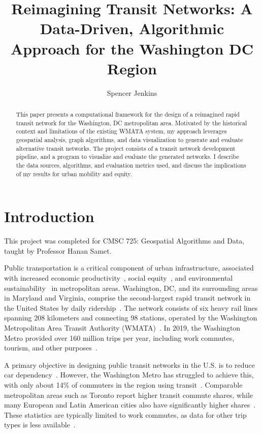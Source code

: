 \documentclass[manuscript,nonacm]{acmart}
\begin{document}
\title{Reimagining Transit Networks: A Data-Driven, Algorithmic Approach for the Washington DC Region}

\author{Spencer Jenkins}

\renewcommand{\shortauthors}{Trovato et al.}

\begin{abstract}
This paper presents a computational framework for the design of a reimagined rapid transit network for the Washington, DC metropolitan area. Motivated by the historical context and limitations of the existing WMATA system, my approach leverages geospatial analysis, graph algorithms, and data visualization to generate and evaluate alternative transit networks. The project consists of a transit network development pipeline, and a program to visualize and evaluate the generated networks. I describe the data sources, algorithms, and evaluation metrics used, and discuss the implications of my results for urban mobility and equity.
\end{abstract}

\maketitle



\section{Introduction}

This project was completed for CMSC 725: Geospatial Algorithms and Data, taught by Professor Hanan Samet. 

Public transportation is a critical component of urban infrastructure, associated with increased economic productivity~\cite{lit:us_transit_policy}, social equity~\cite{lit:equity}, and environmental sustainability~\cite{lit:us_transit_policy} in metropolitan areas. Washington, DC, and its surrounding areas in Maryland and Virginia, comprise the second-largest rapid transit network in the United States by daily ridership~\cite{lit:wmata_stats}. The network consists of six heavy rail lines spanning 208 kilometers and connecting 98 stations, operated by the Washington Metropolitan Area Transit Authority (WMATA)~\cite{lit:wmata_stats}. In 2019, the Washington Metro provided over 160 million trips per year, including work commutes, tourism, and other purposes~\cite{lit:wmata_stats}.

A primary objective in designing public transit networks in the U.S. is to reduce car dependency~\cite{lit:us_transit_policy}. However, the Washington Metro has struggled to achieve this, with only about 14\% of commuters in the region using transit~\cite{lit:commute_stats}. Comparable metropolitan areas such as Toronto report higher transit commute shares, while many European and Latin American cities also have significantly higher shares~\cite{lit:toronto}. These statistics are typically limited to work commutes, as data for other trip types is less available~\cite{lit:commute_stats}.
\end{document}
